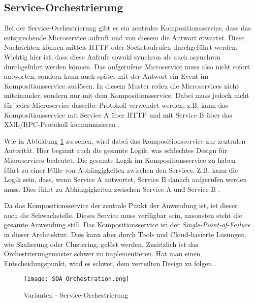 \subsection{Service-Orchestrierung}
Bei der Service-Orchestrierung gibt es ein zentrales Kompositionsservice, dass das entsprechende Microservice aufruft und von diesem die Antwort erwartet. Diese Nachrichten können mittels HTTP oder Socketaufrufen durchgeführt werden. Wichtig hier ist, dass diese Aufrufe sowohl synchron als auch asynchron durchgeführt werden können. Das aufgerufene Microservice muss also nicht sofort antworten, sondern kann auch später mit der Antwort ein Event im Kompositionsservice auslösen.
In diesem Muster reden die Microservices nicht miteinander, sondern nur mit dem Kompositionsservice. Dabei muss jedoch nicht für jedes Microservice dasselbe Protokoll verwendet werden, z.B. kann das Kompositionsservice mit Service A über HTTP und mit Service B über das XML/RPC-Protokoll kommunizieren \cite{PracticalMicroservices}.

Wie in Abbildung \ref{fig:SOA_Orchestrierung} zu sehen, wird dabei das Kompositionsservice zur zentralen Autorität. Hier beginnt auch die gesamte Logik, was schlechtes Design für Microservices bedeutet. Die gesamte Logik im Kompositionsservice zu haben führt zu einer Fülle von Abhängigkeiten zwischen den Services. Z.B. kann die Logik sein, dass, wenn Service A antwortet, Service B danach aufgerufen werden muss. Dies führt zu Abhängigkeiten zwischen Service A und Service B \cite{PracticalMicroservices}.

Da das Kompositionsservice der zentrale Punkt der Anwendung ist, ist dieser auch die Schwachstelle. Dieses Service muss verfügbar sein, ansonsten steht die gesamte Anwendung still. Das Kompositionsservice ist der \textit{Single-Point-of-Failure} in dieser Architektur. Dies kann aber durch Tools und Cloud-basierte Lösungen, wie Skalierung oder Clustering, gelöst werden. Zusätzlich ist das Orchestrierungsmuster schwer zu implementieren. Hat man einen Entscheidungspunkt, wird es schwer, dem verteilten Design zu folgen \cite{PracticalMicroservices}.

\begin{figure}[H]
	\begin{center}
		\texttt{[image: SOA\_Orchestration.png]}
		\caption[Designvarianten - Service-Orchestrierung]{Varianten - Service-Orchestrierung \cite{PracticalMicroservices}}
		\label{fig:SOA_Orchestrierung}
	\end{center}
\end{figure}


